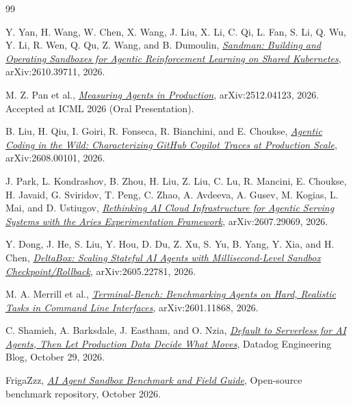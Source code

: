 \documentclass[
  a4paper,
]{article}
\begin{document}
\clearpage
{}
{}

\begin{thebibliography}{99}
\small


Y. Yan, H. Wang, W. Chen, X. Wang, J. Liu, X. Li,
C. Qi, L. Fan, S. Li, Q. Wu, Y. Li, R. Wen, Q. Qu,
Z. Wang, and B. Dumoulin,
\emph{\href{https://arxiv.org/abs/2610.39711}
{Sandman: Building and Operating Sandboxes for Agentic
Reinforcement Learning on Shared Kubernetes}},
arXiv:2610.39711, 2026.

M. Z. Pan et al.,
\emph{\href{https://arxiv.org/abs/2512.04123}
{Measuring Agents in Production}},
arXiv:2512.04123, 2026.
Accepted at ICML 2026 (Oral Presentation).

B. Liu, H. Qiu, I. Goiri, R. Fonseca,
R. Bianchini, and E. Choukse,
\emph{\href{https://arxiv.org/abs/2608.00101}
{Agentic Coding in the Wild: Characterizing
GitHub Copilot Traces at Production Scale}},
arXiv:2608.00101, 2026.

J. Park, L. Kondrashov, B. Zhou, H. Liu, Z. Liu,
C. Lu, R. Mancini, E. Choukse, H. Javaid,
G. Sviridov, T. Peng, C. Zhao, A. Avdeeva,
A. Gusev, M. Kogias, L. Mai, and D. Ustiugov,
\emph{\href{https://arxiv.org/abs/2607.29069}
{Rethinking AI Cloud Infrastructure for Agentic Serving
Systems with the Aries Experimentation Framework}},
arXiv:2607.29069, 2026.

Y. Dong, J. He, S. Liu, Y. Hou, D. Du, Z. Xu,
S. Yu, B. Yang, Y. Xia, and H. Chen,
\emph{\href{https://arxiv.org/abs/2605.22781}
{DeltaBox: Scaling Stateful AI Agents with
Millisecond-Level Sandbox Checkpoint/Rollback}},
arXiv:2605.22781, 2026.

M. A. Merrill et al.,
\emph{\href{https://arxiv.org/abs/2601.11868}
{Terminal-Bench: Benchmarking Agents on Hard,
Realistic Tasks in Command Line Interfaces}},
arXiv:2601.11868, 2026.

C. Shamieh, A. Barksdale, J. Eastham, and O. Nzia,
\emph{\href{https://www.datadoghq.com/blog/serverless-ai-agents/}
{Default to Serverless for AI Agents, Then Let Production
Data Decide What Moves}},
Datadog Engineering Blog, October 29, 2026.

FrigaZzz,
\emph{\href{https://github.com/FrigaZzz/agent-sandbox-benchmark}
{AI Agent Sandbox Benchmark and Field Guide}},
Open-source benchmark repository, October 2026.


\end{thebibliography}
\end{document}
